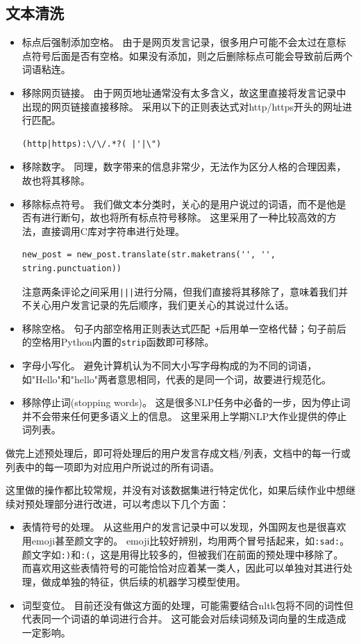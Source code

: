 \documentclass[logo,reportComp]{thesis}
\begin{document}
\subsection{文本清洗}
\begin{itemize}
	\item 标点后强制添加空格。
	由于是网页发言记录，很多用户可能不会太过在意标点符号后面是否有空格。如果没有添加，则之后删除标点可能会导致前后两个词语粘连。
	\item 移除网页链接。
	由于网页地址通常没有太多含义，故这里直接将发言记录中出现的网页链接直接移除。
	采用以下的正则表达式对http/https开头的网址进行匹配。
\begin{lstlisting}
(http|https):\/\/.*?( |'|\")
\end{lstlisting}
	\item 移除数字。
	同理，数字带来的信息非常少，无法作为区分人格的合理因素，故也将其移除。
	\item 移除标点符号。
	我们做文本分类时，关心的是用户说过的词语，而不是他是否有进行断句，故也将所有标点符号移除。
	这里采用了一种比较高效的方法，直接调用C库对字符串进行处理。
\begin{lstlisting}
new_post = new_post.translate(str.maketrans('', '', string.punctuation))
\end{lstlisting}
	注意两条评论之间采用\verb'|||'进行分隔，但我们直接将其移除了，意味着我们并不关心用户发言记录的先后顺序，我们更关心的其说过什么话。
	\item 移除空格。
	句子内部空格用正则表达式匹配\verb' +'后用单一空格代替；句子前后的空格用Python内置的\verb'strip'函数即可移除。
	\item 字母小写化。
	避免计算机认为不同大小写字母构成的为不同的词语，如"Hello"和"hello"两者意思相同，代表的是同一个词，故要进行规范化。
	\item 移除停止词(stopping words)。
	这是很多NLP任务中必备的一步，因为停止词并不会带来任何更多语义上的信息。
	这里采用上学期NLP大作业提供的停止词列表\cite{bib:stopping_words}。
\end{itemize}

做完上述预处理后，即可将处理后的用户发言存成文档/列表，文档中的每一行或列表中的每一项即为对应用户所说过的所有词语。

这里做的操作都比较常规，并没有对该数据集进行特定优化，如果后续作业中想继续对预处理部分进行改进，可以考虑以下几个方面：
\begin{itemize}
	\item 表情符号的处理。
	从这些用户的发言记录中可以发现，外国网友也是很喜欢用emoji甚至颜文字的。
	emoji比较好辨别，均用两个冒号括起来，如\verb':sad:'。
	颜文字如\verb':)'和\verb':('，这是用得比较多的，但被我们在前面的预处理中移除了。
	而喜欢用这些表情符号的可能恰恰对应着某一类人，因此可以单独对其进行处理，做成单独的特征，供后续的机器学习模型使用。
	\item 词型变位。
	目前还没有做这方面的处理，可能需要结合nltk包将不同的词性但代表同一个词语的单词进行合并。
	这可能会对后续词频及词向量的生成造成一定影响。
\end{itemize}
\end{document}
